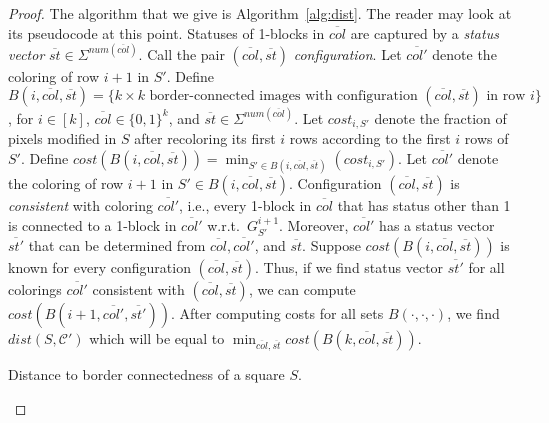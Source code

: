 \documentclass[11pt,english]{article}
\numberwithin{figure}{section}
\newcommand{\C}{{\mathcal C}}
\newcommand{\dis}{dist}
\begin{document}
\begin{proof}
The algorithm that we give is Algorithm~\ref{alg:dist}. The reader may look at its pseudocode at this point. Statuses of 1-blocks in $\overline{col}$ are captured by a {\em status vector} $\overline{st}\in\Sigma^{num(\overline{col})}$. Call the pair $(\overline{col},\overline{st})$ {\em configuration}. Let $\overline{col'}$ denote the coloring of row $i+1$ in $S'$. Define $B(i,\overline{col},\overline{st})=\{k\times k \text{ border-connected images with configuration } (\overline{col},\overline{st}) \text{ in row }i\}$, for $i\in[k]$, $\overline{col}\in\{0,1\}^k$, and $\overline{st}\in\Sigma^{num(\overline{col})}$. Let $cost_{i,S'}$ denote the fraction of pixels modified in $S$ after recoloring its first $i$ rows according to the first $i$ rows of $S'$. Define ${cost}(B(i,\overline{col},\overline{st}))=\min_{S'\in B(i,\overline{col},\overline{st})}(cost_{i,S'})$. Let $\overline{col'}$ denote the coloring of row $i+1$ in $S'\in B(i,\overline{col},\overline{st})$. Configuration $(\overline{col},\overline{st})$ is {\em consistent} with coloring $\overline{col'}$, i.e., every 1-block in $\overline{col}$ that has status other than 1 is connected to a 1-block in $\overline{col'}$ w.r.t.\ $G^{i+1}_{S'}$. Moreover, $\overline{col'}$ has a status vector $\overline{st'}$ that can be determined from $\overline{col},\overline{col'}$, and $\overline{st}$. Suppose ${cost}(B(i,\overline{col},\overline{st}))$ is known for every configuration $(\overline{col},\overline{st})$. Thus, if we find status vector $\overline{st'}$ for all colorings $\overline{col'}$ consistent with $(\overline{col},\overline{st})$, we can compute $cost(B(i+1,\overline{col'},\overline{st'}))$. After computing costs for all sets $B(\cdot,\cdot,\cdot)$, we find $\dis(S,\C')$ which will be equal to $\min_{\overline{col},\overline{st}}cost(B(k,\overline{col},\overline{st}))$.

\begin{algorithm}
\caption{Distance to border connectedness of a square $S$.}
\label{alg:dist}
\DontPrintSemicolon
\BlankLine
\nl\label{st:init} 


\end{algorithm}
\end{proof}
\end{document}
